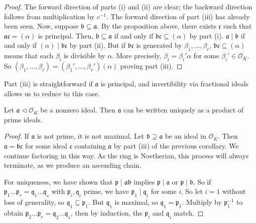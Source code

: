\begin{proof}
    The forward direction of parts (i) and (ii) are clear; the backward direction follows from multiplication by \( c^{-1} \).
    The forward direction of part (iii) has already been seen.
    Now, suppose \( \mathfrak b \subseteq \mathfrak a \).
    By the proposition above, there exists \( \mathfrak c \) such that \( \mathfrak a \mathfrak c = (\alpha) \) is principal.
    Then, \( \mathfrak b \subseteq \mathfrak a \) if and only if \( \mathfrak b \mathfrak c \subseteq (\alpha) \) by part (i).
    \( \mathfrak a \mid \mathfrak b \) if and only if \( (\alpha) \mid \mathfrak b \mathfrak c \) by part (ii).
    But if \( \mathfrak b \mathfrak c \) is generated by \( \beta_1, \dots, \beta_r \), \( \mathfrak b \mathfrak c \subseteq (\alpha) \) means that each \( \beta_i \) is divisible by \( \alpha \).
    More precisely, \( \beta_i = \beta_i' \alpha \) for some \( \beta_i' \in \mathcal O_K \).
    So \( (\beta_1, \dots, \beta_r) = (\beta_1', \dots, \beta_r') (\alpha) \) proving part (iii).
\end{proof}
\begin{remark}
    Part (iii) is straightforward if \( \mathfrak a \) is principal, and invertibility via fractional ideals allows us to reduce to this case.
\end{remark}
\begin{theorem}
    Let \( \mathfrak a \triangleleft \mathcal O_K \) be a nonzero ideal.
    Then \( \mathfrak a \) can be written uniquely as a product of prime ideals.
\end{theorem}
\begin{proof}
    If \( \mathfrak a \) is not prime, it is not maximal.
    Let \( \mathfrak b \supsetneq \mathfrak a \) be an ideal in \( \mathcal O_K \).
    Then \( \mathfrak a = \mathfrak b \mathfrak c \) for some ideal \( \mathfrak c \) containing \( \mathfrak a \) by part (iii) of the previous corollary.
    We continue factoring in this way.
    As the ring is Noetherian, this process will always terminate, as we produce an ascending chain.

    For uniqueness, we have shown that \( \mathfrak p \mid \mathfrak a \mathfrak b \) implies \( \mathfrak p \mid \mathfrak a \) or \( \mathfrak p \mid \mathfrak b \).
    So if \( \mathfrak p_1 \dots \mathfrak p_r = \mathfrak q_1 \dots \mathfrak q_s \) with \( \mathfrak p_i, \mathfrak q_i \) prime, we have \( \mathfrak p_1 \mid \mathfrak q_i \) for some \( i \).
    So let \( i = 1 \) without loss of generality, so \( \mathfrak q_1 \subseteq \mathfrak p_1 \).
    But \( \mathfrak q_1 \) is maximal, so \( \mathfrak q_1 = \mathfrak p_1 \).
    Multiply by \( \mathfrak p_1^{-1} \) to obtain \( \mathfrak p_2 \dots \mathfrak p_r = \mathfrak q_2 \dots \mathfrak q_s \), then by induction, the \( \mathfrak p_i \) and \( \mathfrak q_i \) match.
\end{proof}
